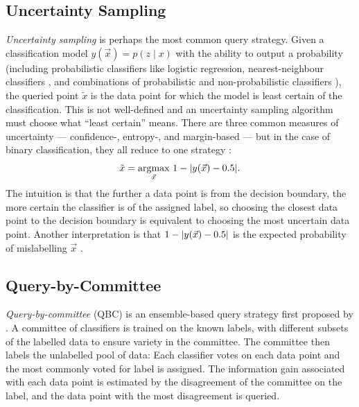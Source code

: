     \subsection{Uncertainty Sampling}
    \label{sec:uncertainty-sampling}

        \emph{Uncertainty sampling} \citep{lewis94} is perhaps the most common
        query strategy. Given a classification model $y(\vec x) = p(z \mid x)$
        with the ability to output a probability (including probabilistic
        classifiers like logistic regression, nearest-neighbour classifiers
        \citep{lewis94}, and combinations of probabilistic and non-probabilistic
        classifiers \citep{lewis94b}), the queried point $\tilde x$ is the data
        point for which the model is least certain of the classification. This
        is not well-defined and an uncertainty sampling algorithm must choose
        what ``least certain'' means. There are three common measures of
        uncertainty --- confidence-, entropy-, and margin-based --- but in the
        case of binary classification, they all reduce to one strategy
        \citep{settles09}:
        \[
            \tilde x = \underset{\vec x}{\mbox{argmax}}\ 1 - |y(\vec x) - 0.5|.
        \]
        The intuition is that the further a data point is from the decision
        boundary, the more certain the classifier is of the assigned label, so
        choosing the closest data point to the decision boundary is equivalent
        to choosing the most uncertain data point. Another interpretation is that $1 - |y(\vec x) - 0.5|$ is the expected probability of mislabelling $\vec x$ \citep{settles09}.



    \subsection{Query-by-Committee}
    \label{sec:qbc}

        \emph{Query-by-committee} (QBC) is an ensemble-based query strategy
        first proposed by \citet{seung92}. A committee of classifiers is trained
        on the known labels, with different subsets of the labelled data to
        ensure variety in the committee. The committee then labels the
        unlabelled pool of data: Each classifier votes on each data point and
        the most commonly voted for label is assigned. The information gain
        associated with each data point is estimated by the disagreement of the
        committee on the label, and the data point with the most disagreement is
        queried.

